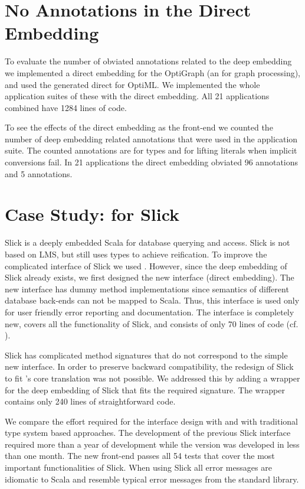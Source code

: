 \section{No Annotations in the Direct Embedding}
\label{subsec:correctness}

To evaluate the number of obviated annotations related to the deep embedding we
implemented a direct embedding for the OptiGraph \edsl (an \edsl for graph
processing), and used the generated direct \edsl for OptiML. We implemented
the whole application suites of these \edsls with the direct embedding. All 21
applications combined have 1284 lines of code.

To see the effects of the direct embedding as the front-end we counted the
number of deep embedding related annotations that were used in the application
suite. The counted annotations are  for types and 
for lifting literals when implicit conversions fail. In 21 applications
the direct embedding obviated 96  annotations and 5
 annotations.

\section{Case Study: \yy for Slick}
\label{subsec:slick}
Slick is a deeply embedded Scala \edsl for database querying and access. Slick
is not based on LMS, but still uses  types to achieve reification.
To improve the complicated interface of Slick we used \yy.
However, since the deep embedding of Slick already exists, we first designed the new
interface (direct embedding). The new interface has dummy method
implementations since semantics of different database back-ends can not be
mapped to Scala. Thus, this interface is used only for user friendly error reporting and
documentation. The interface is completely new, covers all the functionality of Slick,
 and consists of only 70 lines of code (cf. \cite{techrep}).

Slick has complicated method signatures that do not correspond to the simple new
interface. In order to preserve backward compatibility, the redesign of Slick to
fit \yy's core translation was not possible. We addressed this by adding a
wrapper for the deep embedding of Slick that fits the required signature.
The wrapper contains only 240 lines of straightforward code.

We compare the effort required for the interface design with \yy and with
traditional type system based approaches. The development of the previous Slick
interface required more than a year of development while the \yy version was
developed in less than one month. The new front-end passes all 54 tests that cover the
most important functionalities of Slick. When using Slick all error messages are
idiomatic to Scala and resemble typical error messages from the standard
library.

